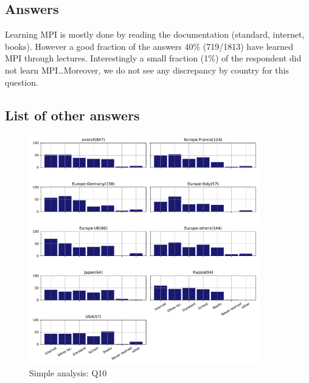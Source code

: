 
\subsection{Answers}


Learning MPI is mostly done by reading the documentation (standard, internet,
books). However a good fraction of the answers 40\% (719/1813) have learned MPI
through lectures. Interestingly a small fraction (1\%) of the respondent did not learn
MPI\ldots Moreover, we do not see any discrepancy by country for this question.



\subsection{List of other answers}
\begin{itemize}

\end{itemize}

\begin{figure}[htb]
\begin{center}
\includegraphics[width=10cm]{../pdfs/Q10.pdf}
\caption{Simple analysis: Q10}
\label{fig:Q10}
\end{center}
\end{figure}

